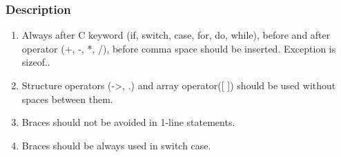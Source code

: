 \subsubsection{Description}
\begin{enumerate}
    \item Always after C keyword (if, switch, case, for, do, while), before and after operator (+, -, *, /), before comma space should be inserted. Exception is sizeof.. 
    \item Structure operators (->, .) and array operator([ ]) should be used without spaces between them.
    \item Braces should not be avoided in 1-line statements.
    \item Braces should be always used in switch case.
\end{enumerate}

